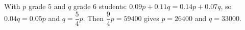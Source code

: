 With $p$ grade $5$ and $q$ grade $6$ students: $0.09p+0.11q=0.14p+0.07q$, so $0.04q=0.05p$ and $q=\dfrac54p$. Then $\dfrac94p=59400$ gives $p=26400$ and $q=\boxed{33000}$.
